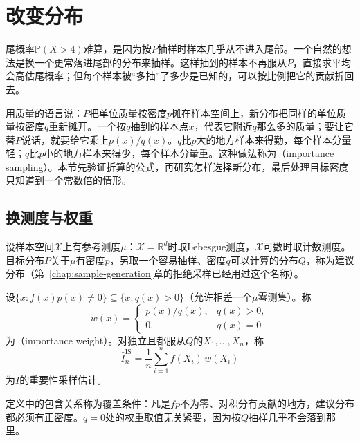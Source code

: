 \section{改变分布}
\label{sec:vr-change-distribution}

尾概率$\mathbb{P}(X>4)$难算，是因为按$P$抽样时样本几乎从不进入尾部。一个自然的想法是换一个更常落进尾部的分布来抽样。这样抽到的样本不再服从$P$，直接求平均会高估尾概率；但每个样本被“多抽”了多少是已知的，可以按比例把它的贡献折回去。

用质量的语言说：$P$把单位质量按密度$p$摊在样本空间上，新分布把同样的单位质量按密度$q$重新摊开。一个按$q$抽到的样本点$x$，代表它附近$q$那么多的质量；要让它替$P$说话，就要给它乘上$p(x)/q(x)$。$q$比$p$大的地方样本来得勤，每个样本分量轻；$q$比$p$小的地方样本来得少，每个样本分量重。这种做法称为（importance sampling）。本节先验证折算的公式，再研究怎样选择新分布，最后处理目标密度只知道到一个常数倍的情形。

\subsection{换测度与权重}
\label{sec:vr-change-of-measure}

设样本空间$\mathcal{X}$上有参考测度$\mu$：$\mathcal{X}=\mathbb{R}^{d}$时取Lebesgue测度，$\mathcal{X}$可数时取计数测度。目标分布$P$关于$\mu$有密度$p$，另取一个容易抽样、密度$q$可以计算的分布$Q$，称为建议分布（第~\ref{chap:sample-generation}章的拒绝采样已经用过这个名称）。

\begin{definition}[重要性采样估计]
\label{def:vr-importance-sampling}
设$\{x:f(x)p(x)\neq0\}\subseteq\{x:q(x)>0\}$（允许相差一个$\mu$零测集）。称
\begin{equation}
 w(x)=\begin{cases}p(x)/q(x), & q(x)>0,\\ 0, & q(x)=0\end{cases}
 \label{eq:vr-importance-weight}
\end{equation}
为（importance weight）。对独立且都服从$Q$的$X_1,\dots,X_n$，称
\begin{equation}
 \hat{I}_n^{\mathrm{IS}}=\frac1n\sum_{i=1}^{n}f(X_i)\,w(X_i)
 \label{eq:vr-is-estimator}
\end{equation}
为$I$的重要性采样估计。
\end{definition}

定义中的包含关系称为覆盖条件：凡是$fp$不为零、对积分有贡献的地方，建议分布都必须有正密度。$q=0$处的权重取值无关紧要，因为按$Q$抽样几乎不会落到那里。

